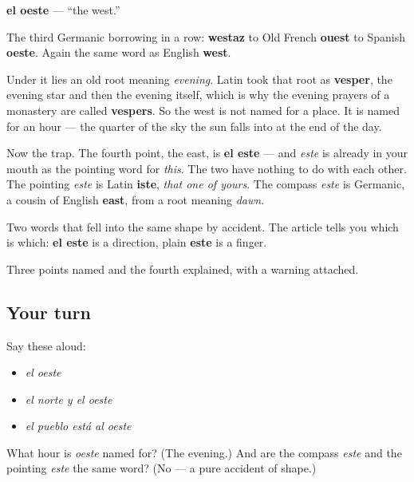 \begin{cousinweb}
\textbf{el oeste} — \textquotedblleft{}the west.\textquotedblright{}

The third Germanic borrowing in a row: \textbf{westaz} to Old French \textbf{ouest} to Spanish \textbf{oeste}. Again the same word as English \textbf{west}.

Under it lies an old root meaning \emph{evening}. Latin took that root as \textbf{vesper}, the evening star and then the evening itself, which is why the evening prayers of a monastery are called \textbf{vespers}. So the west is not named for a place. It is named for an hour — the quarter of the sky the sun falls into at the end of the day.

Now the trap. The fourth point, the east, is \textbf{el este} — and \emph{este} is already in your mouth as the pointing word for \emph{this}. The two have nothing to do with each other. The pointing \emph{este} is Latin \textbf{iste}, \emph{that one of yours}. The compass \emph{este} is Germanic, a cousin of English \textbf{east}, from a root meaning \emph{dawn}.

Two words that fell into the same shape by accident. The article tells you which is which: \textbf{el este} is a direction, plain \textbf{este} is a finger.
\end{cousinweb}

\begin{grammarlens}[title={What you've built}]
Three points named and the fourth explained, with a warning attached.
\end{grammarlens}

\subsection*{Your turn}
Say these aloud:

\begin{itemize}
\raggedright
  \item \emph{el oeste}
  \item \emph{el norte y el oeste}
  \item \emph{el pueblo está al oeste}
\end{itemize}

\begin{tcolorbox}[breakable,colback=teal!4,colframe=teal!35!black,title={Before you move on}]
What hour is \emph{oeste} named for? (The evening.) And are the compass \emph{este} and the pointing \emph{este} the same word? (No — a pure accident of shape.)
\end{tcolorbox}
